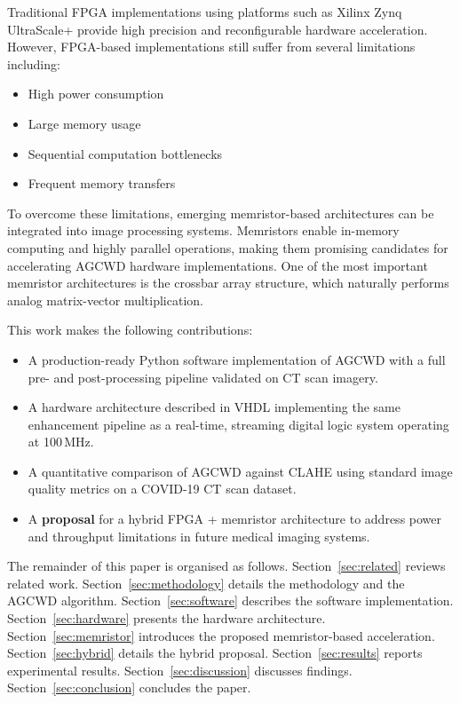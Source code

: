 \documentclass[conference]{IEEEtran}
\begin{document}
Traditional FPGA implementations using platforms such as Xilinx Zynq UltraScale+ provide high precision and reconfigurable hardware acceleration. However, FPGA-based implementations still suffer from several limitations including:
\begin{itemize}
    \item High power consumption
    \item Large memory usage
    \item Sequential computation bottlenecks
    \item Frequent memory transfers
\end{itemize}

To overcome these limitations, emerging memristor-based architectures can be integrated into image processing systems. Memristors enable in-memory computing and highly parallel operations, making them promising candidates for accelerating AGCWD hardware implementations. One of the most important memristor architectures is the crossbar array structure, which naturally performs analog matrix-vector multiplication.

This work makes the following contributions:
\begin{itemize}
  \item A production-ready Python software implementation of AGCWD with a full pre- and post-processing pipeline validated on CT scan imagery.
  \item A hardware architecture described in VHDL implementing the same enhancement pipeline as a real-time, streaming digital logic system operating at 100\,MHz.
  \item A quantitative comparison of AGCWD against CLAHE using standard image quality metrics on a COVID-19 CT scan dataset.
  \item A \textbf{proposal} for a hybrid FPGA + memristor architecture to address power and throughput limitations in future medical imaging systems.
\end{itemize}

The remainder of this paper is organised as follows. Section~\ref{sec:related} reviews related work. Section~\ref{sec:methodology} details the methodology and the AGCWD algorithm. Section~\ref{sec:software} describes the software implementation. Section~\ref{sec:hardware} presents the hardware architecture. Section~\ref{sec:memristor} introduces the proposed memristor-based acceleration. Section~\ref{sec:hybrid} details the hybrid proposal. Section~\ref{sec:results} reports experimental results. Section~\ref{sec:discussion} discusses findings. Section~\ref{sec:conclusion} concludes the paper.
\end{document}
